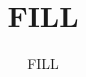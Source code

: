 \documentclass{article}
\title{FILL}
\author{FILL}
\begin{document}
\maketitle

\begin{abstract}
\end{abstract}





\end{document}
